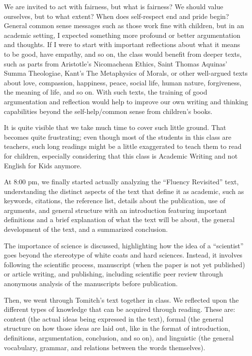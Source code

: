 We are invited to act with fairness, but what is fairness? We should value ourselves, but to what extent? When does self-respect end and pride begin? General common sense messages such as those work fine with children, but in an academic setting, I expected something more profound or better argumentation and thoughts. If I were to start with important reflections about what it means to be good, have empathy, and so on, the class would benefit from deeper texts, such as parts from Aristotle's Nicomachean Ethics, Saint Thomas Aquinas' Summa Theologiae, Kant's The Metaphysics of Morals, or other well-argued texts about love, compassion, happiness, peace, social life, human nature, forgiveness, the meaning of life, and so on. With such texts, the training of good argumentation and reflection would help to improve our own writing and thinking capabilities beyond the self-help/common sense from children's books.

It is quite visible that we take much time to cover such little ground. That becomes quite frustrating; even though most of the students in this class are teachers, such long readings might be a little exaggerated to teach them to read for children, especially considering that this class is Academic Writing and not English for Kids anymore.

At 8:00 pm, we finally started actually analyzing the ``Fluency Revisited'' text, understanding the distinct aspects of the text that define it as academic, such as keywords, citations, the reference list, details about the publication, use of arguments, and general structure with an introduction featuring important definitions and a brief explanation of what the text will be about, the general development of the text, and a summarized conclusion.

The importance of science is discussed, highlighting how the idea of a ``scientist'' goes beyond the stereotype of white coats and hard sciences. Instead, it involves following the scientific process, manuscript (when the paper is not yet published) or article writing, and publishing, including scientific peer review through anonymous analysis of the manuscripts before publication.

Then, we went through Tomitch's text together in class. We reflected upon the different types of knowledge that can be acquired through reading. These are: content (the actual ideas being expressed in the text), formal (the general structure on how those ideas are laid out, like in the format of introduction, definitions, argumentation, conclusion, and so on), and linguistic (the general vocabulary, grammar, and relations between the words themselves).

